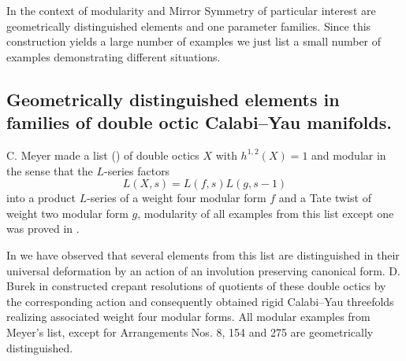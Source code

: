 \documentclass[12pt]{amsart}
\theoremstyle{plain}
\theoremstyle{remark}
\theoremstyle{definition}
\numberwithin{table}{section}
\begin{document}
In the context of modularity and Mirror Symmetry of particular interest are geometrically distinguished elements and one parameter families. Since this construction yields a large number of examples we just list a small number of examples demonstrating different situations.

\subsection{Geometrically distinguished elements in families of double octic Calabi--Yau manifolds.}

	C. Meyer made a list (\cite[p. 59]{Meyer}) of double octics $X$ with $h^{1,2}(X)=1$ and modular in the sense that the $L$-series  factors
	\[L(X,s)=L(f,s)L(g,s-1)\]
	into a product $L$-series of a weight four modular form $f$ and a Tate twist of weight two modular form $g$, modularity of all examples from this list except one was proved in \cite{CM}.

	In \cite{CK-C} we have observed that several elements from this list are distinguished in their universal deformation by an action of an involution preserving canonical form.
	D. Burek in \cite{Burek}  constructed crepant resolutions of quotients of these double octics by the corresponding action and consequently obtained  rigid Calabi--Yau threefolds realizing  associated weight four modular forms.
	All modular examples from Meyer's list, except for Arrangements Nos. 8, 154 and 275 are geometrically distinguished.
\end{document}
